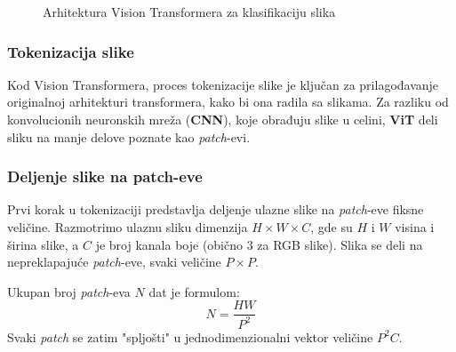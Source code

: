 \documentclass[12pt]{article}
\begin{document}
   \begin{figure}[h!]
      \centering
      \vspace{1cm} %
      \caption{Arhitektura Vision Transformera za klasifikaciju slika}
      \label{fig:vit_architecture}
   \end{figure}
   \newpage

   \subsubsection{Tokenizacija slike}
   Kod Vision Transformera, proces tokenizacije slike je ključan za prilagođavanje originalnoj arhitekturi 
   transformera, kako bi ona radila sa slikama. Za razliku od konvolucionih neuronskih mreža 
   (\textbf{CNN}), koje obrađuju slike u celini, \textbf{ViT} deli sliku na manje 
   delove poznate kao \textit{patch}-evi.
   
   \subsubsection*{Deljenje slike na patch-eve}
   Prvi korak u tokenizaciji predstavlja deljenje ulazne slike na \textit{patch}-eve fiksne veličine. 
   Razmotrimo ulaznu sliku dimenzija \( H \times W \times C \), 
   gde su \( H \) i \( W \) visina i širina slike, a \( C \) je broj 
   kanala boje (obično 3 za RGB slike). Slika se deli na nepreklapajuće \textit{patch}-eve, 
   svaki veličine \( P \times P \).
   
   Ukupan broj \textit{patch}-eva \( N \) dat je formulom:
   \[
   N = \frac{HW}{P^2}
   \]
   Svaki \textit{patch} se zatim "spljošti" u jednodimenzionalni vektor 
   veličine \( P^2C \).
   
\end{document}
